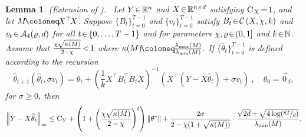 \documentclass[11pt]{article}
\newtheorem{lem}{Lemma}
\theoremstyle{definition}
\theoremstyle{plain}
\newcommand{\reals}{\mathbb{R}}
\newcommand{\nats}{\mathbb{N}}
\newcommand{\Norm}[1]{\left\| #1 \right\|}
\providecommand{\norm}[1]{\Norm{#1}}
\begin{document}
\begin{lem}{(Extension of \citet[Lemma.~12]{lev2026near}).} \ 
    \label{lem:adaptation_no_clipping}
    Let $Y\hspace{-0.15em}\in\hspace{-0.15em} \reals^{n}$ and $X\hspace{-0.15em}\in\hspace{-0.15em} \reals^{n\times d}$ satisfying \(\textsc{C}_{X} \hspace{-0.15em}=\hspace{-0.15em} 1\), and let \(M \hspace{-0.15em}\coloneq\hspace{-0.15em} X^{\top}\hspace{-0.15em}X\). Suppose \(\{B_{t}\}_{t = 0}^{T - 1}\) and \(\{v_{t}\}_{t = 0}^{T - 1}\) satisfy \(B_{t} \hspace{-0.15em}\in\hspace{-0.15em} \mathcal{C}\left(X, \chi, k\right)\) and \(v_{t} \hspace{-0.15em}\in\hspace{-0.15em} \mathcal{A}_{4}(\varrho, d)\) for all \(t \hspace{-0.15em}\in\hspace{-0.15em} \{0,\ldots, T-1\}\) and for parameters \(\chi, \varrho \hspace{-0.15em}\in\hspace{-0.15em} (0, 1]\) and \(k \hspace{-0.15em}\in\hspace{-0.15em} \nats\). Assume that $\frac{\chi\sqrt{\kappa(M)}}{2 - \chi} \hspace{-0.15em}<\hspace{-0.15em} 1$ where $\kappa(M) \hspace{-0.15em}\coloneq\hspace{-0.15em} \frac{\lambda_{\max}(M)}{\lambda_{\min}(M)}.$ If \(\{\widehat{\theta}_{t}\}_{t = 0}^{T - 1}\) is defined according to the recursion
    \begin{equation}
        \widehat{\theta}_{t+1}\left(\widehat{\theta}_t, \sigma v_t\right) = \widehat{\theta}_t + \left(\frac{1}{k}X^{\top}B^{\top}_tB_tX\right)^{-1}\left(X^{\top}\left(Y - X\widehat{\theta}_t\right) + \sigma v_t\right)~, \quad \widehat{\theta}_{0} = \vec{0}_{d},
    \end{equation}
    for $\sigma \geq 0$, then
    \begin{equation}
        \norm{Y - X\widehat{\theta}_t}_{\infty} \leq \textsc{C}_Y + \left(1 + \left(\frac{\chi\sqrt{\kappa(M)}}{2 - \chi}\right)^t\right)\norm{\theta^{*}} + \frac{2 \sigma}{2 - \chi(1 + \sqrt{\kappa(M))}} \cdot \frac{\sqrt{2d} + \sqrt{4\log(\nicefrac{8T}{\varrho})}}{\lambda_{\min}(M)}.
    \end{equation}
\end{lem}
\end{document}
